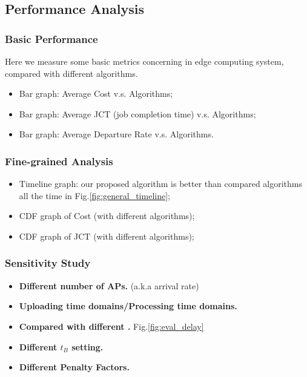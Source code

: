 \subsection{Performance Analysis}
    \subsubsection{Basic Performance}
    Here we measure some basic metrics concerning in edge computing system, compared with different algorithms.
    \begin{itemize}
        \item Bar graph: Average Cost v.s. Algorithms;
        \item Bar graph: Average JCT (job completion time) v.s. Algorithms;
        \item Bar graph: Average Departure Rate v.s. Algorithms. 
    \end{itemize}

    \subsubsection{Fine-grained Analysis}
    \begin{itemize}
        \item Timeline graph: our proposed algorithm is better than compared algorithms all the time in Fig.\ref{fig:general_timeline};
        \item CDF graph of Cost (with different algorithms);
        \item CDF graph of JCT (with different algorithms);
    \end{itemize}

    \subsubsection{Sensitivity Study}
    \begin{itemize}
        \item \textbf{Different number of APs.} (a.k.a arrival rate)
        \item \textbf{Uploading time domains/Processing time domains.}
        \item \textbf{Compared with different \brlatency.} Fig.\ref{fig:eval_delay}
        \item \textbf{Different $t_B$ setting.}
        \item \textbf{Different Penalty Factors.}
    \end{itemize}

